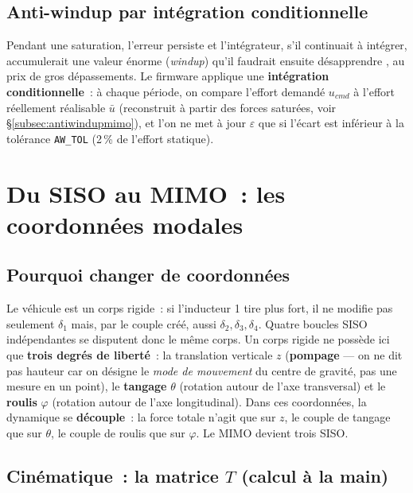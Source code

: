 \documentclass[a4paper,11pt]{article}
\begin{document}
\subsection{Anti-windup par intégration conditionnelle}

Pendant une saturation, l'erreur persiste et l'intégrateur, s'il continuait à
intégrer, accumulerait une valeur énorme (\emph{windup}) qu'il faudrait
ensuite \og désapprendre \fg, au prix de gros dépassements. Le firmware
applique une \textbf{intégration conditionnelle}~: à chaque période, on
compare l'effort demandé $u_{cmd}$ à l'effort réellement réalisable $\bar u$
(reconstruit à partir des forces saturées, voir §\ref{subsec:antiwindupmimo}),
et l'on ne met à jour $\varepsilon$ que si l'écart est inférieur à la
tolérance \texttt{AW\_TOL} (2\,\% de l'effort statique).

\section{Du SISO au MIMO~: les coordonnées modales}
\label{sec:modal}

\subsection{Pourquoi changer de coordonnées}

Le véhicule est un corps rigide~: si l'inducteur 1 tire plus fort, il ne
modifie pas seulement $\delta_1$ mais, par le couple créé, aussi $\delta_2,
\delta_3, \delta_4$. Quatre boucles SISO indépendantes se \og disputent \fg{}
donc le même corps. Un corps rigide ne possède ici que \textbf{trois degrés de
liberté}~: la translation verticale $z$ (\textbf{pompage} --- on ne dit pas
\og hauteur \fg{} car on désigne le \emph{mode de mouvement} du centre de
gravité, pas une mesure en un point), le \textbf{tangage} $\theta$ (rotation
autour de l'axe transversal) et le \textbf{roulis} $\varphi$ (rotation autour
de l'axe longitudinal). Dans ces coordonnées, la dynamique se
\textbf{découple}~: la force totale n'agit que sur $z$, le couple de tangage
que sur $\theta$, le couple de roulis que sur $\varphi$. Le MIMO devient trois
SISO.

\subsection{Cinématique~: la matrice $T$ (calcul à la main)}
\label{subsec:T}
\end{document}
